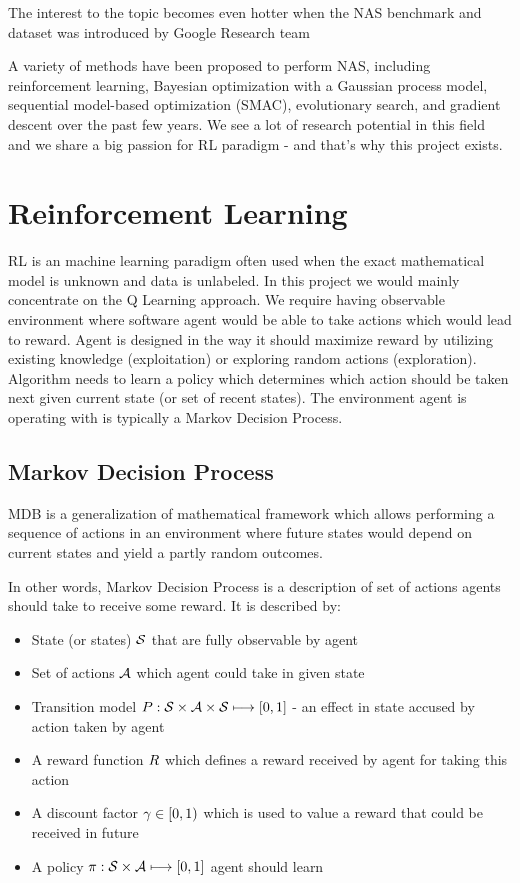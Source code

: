 The interest to the topic becomes even hotter when the NAS benchmark and dataset was introduced by Google Research team \cite{pmlr-v97-ying19a}

A variety of methods have been proposed to perform NAS, including reinforcement learning, Bayesian optimization with a Gaussian process model, sequential model-based optimization (SMAC), evolutionary search, and gradient descent over the past few years. We see a lot of research potential in this field and we share a big passion for RL paradigm - and that's why this project exists.

\section{Reinforcement Learning}

RL is an machine learning paradigm often used when the exact mathematical model is unknown and data is unlabeled. In this project we would mainly concentrate on the Q Learning approach. We require having observable environment where software agent would be able to take actions which would lead to reward. Agent is designed in the way it should maximize reward by utilizing existing knowledge (exploitation) or exploring random actions (exploration). Algorithm needs to learn a policy which determines which action should be taken next given current state (or set of recent states). The environment agent is operating with is typically a Markov Decision Process.

\subsection{Markov Decision Process}

MDB is a generalization of mathematical framework which allows performing a sequence of actions in an environment where future states would depend on current states and yield a partly random outcomes.

In other words, Markov Decision Process is a description of set of actions agents should take to receive some reward. It is described by:
\begin{itemize}
  \item State (or states) $\mathcal{S}$ that are fully observable by agent
  \item Set of actions $\mathcal{A}$ which agent could take in given state
  \item Transition model $P:\mathcal{S} \times \mathcal{A} \times \mathcal{S} \longmapsto [0,1]$ - an effect in state accused by action taken by agent
  \item A reward function $R$ which defines a reward received by agent for taking this action
  \item A discount factor $\gamma \in [0, 1)$ which is used to value a reward that could be received in future
  \item A policy $\pi : \mathcal{S} \times \mathcal{A} \longmapsto [0, 1]$ agent should learn
\end{itemize}

